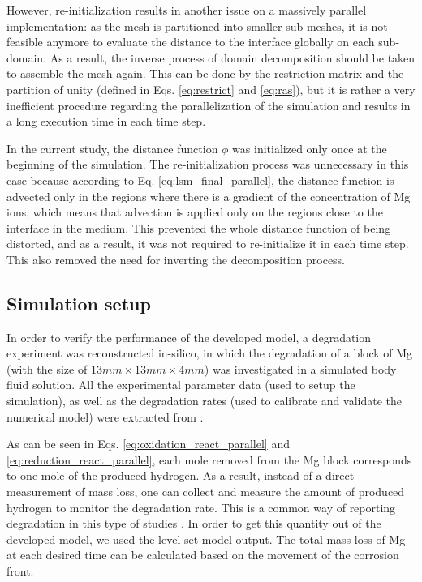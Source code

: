 However, re-initialization results in another issue on a massively parallel implementation: as the mesh is partitioned into smaller sub-meshes, it is not feasible anymore to evaluate the distance to the interface globally on each sub-domain. As a result, the inverse process of domain decomposition should be taken to assemble the mesh again. This can be done by the restriction matrix and the partition of unity (defined in Eqs. \ref{eq:restrict} and \ref{eq:ras}), but it is rather a very inefficient procedure regarding the parallelization of the simulation and results in a long execution time in each time step.

In the current study, the distance function $\phi$ was initialized only once at the beginning of the simulation. The re-initialization process was unnecessary in this case because according to Eq. \ref{eq:lsm_final_parallel}, the distance function is advected only in the regions where there is a gradient of the concentration of Mg ions, which means that advection is applied only on the regions close to the interface in the medium. This prevented the whole distance function of being distorted, and as a result, it was not required to re-initialize it in each time step. This also removed the need for inverting the decomposition process.

\subsection{Simulation setup}

In order to verify the performance of the developed model, a degradation experiment was reconstructed in-silico, in which the degradation of a block of Mg (with the size of $13mm \times 13mm \times 4 mm$) was investigated in a simulated body fluid solution. All the experimental parameter data (used to setup the simulation), as well as the degradation rates (used to calibrate and validate the numerical model) were extracted from \cite{Mei2019}.

As can be seen in Eqs. \ref{eq:oxidation_react_parallel} and \ref{eq:reduction_react_parallel}, each mole removed from the Mg block corresponds to one mole of the produced hydrogen. As a result, instead of a direct measurement of mass loss, one can collect and measure the amount of produced hydrogen to monitor the degradation rate. This is a common way of reporting degradation in this type of studies \cite{Abidin2013}. In order to get this quantity out of the developed model, we used the level set model output. The total mass loss of Mg at each desired time can be calculated based on the movement of the corrosion front:


